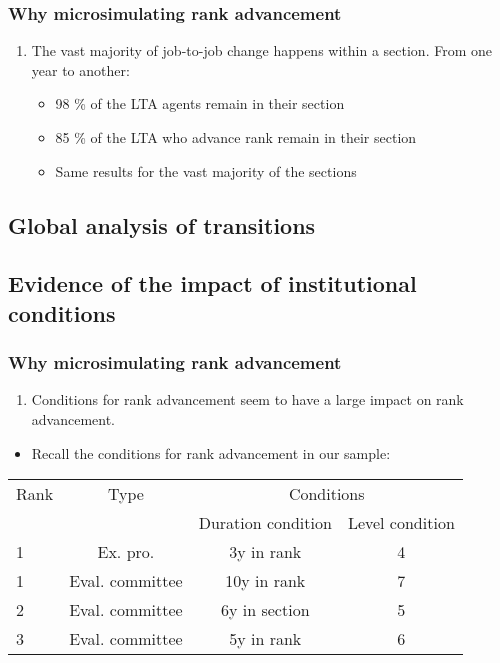 \documentclass[xcolor=table,ignorenonframetext,12pt]{beamer}
\newcounter{sauvegardeenumi}
\newcommand{\asuivre}{\setcounter{sauvegardeenumi}{\theenumi}}
\newcommand{\suite}{\setcounter{enumi}{\thesauvegardeenumi}}
\begin{document}
\begin{frame}
\frametitle{Why microsimulating rank advancement}

\begin{enumerate}
\suite
\item The vast majority of job-to-job change happens within a section. From one year to another:
\begin{itemize}
\item 98 \% of the LTA agents remain in their section
\item 85 \% of the LTA who advance rank remain in their section
\item Same results for the vast majority of the sections
\end{itemize}
\asuivre
\end{enumerate}
\end{frame}

\subsection{Global analysis of transitions}

\subsection{Evidence of the impact of institutional conditions}


\begin{frame}




\frametitle{Why microsimulating rank advancement}
\begin{enumerate}
\suite
\item Conditions for rank advancement seem to have a large impact on rank advancement.
\end{enumerate}
\begin{itemize}
\item Recall the conditions for rank advancement in our sample:
\end{itemize}
\begin{table}
\small
\begin{tabular}{l|c|cc}

\toprule
Rank  & Type &  \multicolumn{2}{c}{Conditions}  \\
&  			&  Duration condition	&  Level condition \\
\midrule
1  &	Ex. pro. 	&   3y in rank  & 	4  \\
1  &	Eval. committee 	& 	10y in rank &	7   \\ \midrule
2  & 	Eval. committee		& 	6y in section  &	5   \\ \midrule
3  & 	Eval. committee		& 	5y in rank  &	6   \\	
%	
\bottomrule
\end{tabular}
\end{table}

\end{frame}
\end{document}
